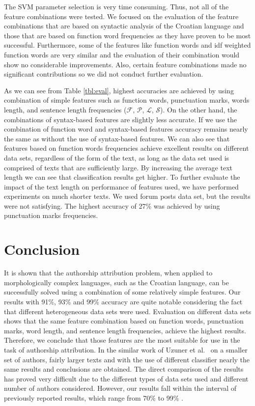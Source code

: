 \documentclass{llncs}
\begin{document}
The SVM parameter selection is very time consuming. Thus, not all of the
feature combinations were tested. We focused on the evaluation of the feature
combinations that are based on syntactic analysis of the Croatian language and
those that are based on function word frequencies as they have proven to be most
successful. Furthermore, some of the features like function words and idf
weighted function words are very similar and the evaluation of their combination
would show no considerable improvements. Also, certain feature combinations made
no significant contributions so we did not conduct further evaluation.

As we can see from Table \ref{tbl:eval}, highest accuracies are achieved by
using combination of simple features such as function words, punctuation marks,
words length, and sentence length frequencies ($\mathcal{F}$, $\mathcal{P}$, $\mathcal{L}$, $\mathcal{S}$). On the other hand, the combinations of syntax-based features are slightly less accurate. If we use the combination of function word and syntax-based features accuracy remains nearly the same as without the use of syntax-based features. We can also see that features based on function words frequencies achieve excellent results on different data sets, regardless
of the form of the text, as long as the data set used is comprised of texts that
are sufficiently large. By increasing the average text length we can see that
classification results get higher. To further evaluate the impact of the text
length on performance of features used, we have performed experiments on much
shorter texts. We used forum posts data set, but the results were not satisfying.
The highest accuracy of 27\% was achieved by using punctuation marks frequencies.

\section{Conclusion}
It is shown that the authorship attribution problem, when applied to
morphologically complex languages, such as the Croatian language, can be
successfully solved using a combination of some relatively simple features. Our
results with 91\%, 93\% and 99\% accuracy are quite notable considering the fact
that different heterogeneous data sets were used. Evaluation on different data
sets shows that the same feature combination based on function words,
punctuation marks, word length, and sentence length frequencies, achieve the
highest results. Therefore, we conclude that those
features are the most suitable for use in the task of authorship
attribution. In the similar work of Uzuner et al.\ \cite{uzuner2005comparative}
on a smaller set of authors, fairly larger texts and with the use of
different classifier nearly the same results and conclusions are obtained. The
direct comparison of the results has proved very difficult due to the different types of data sets
used  and different number of authors considered. However, our results fall
within the interval of previously reported results, which range from 70\% to 99\%
\cite{argamon2005measuring,coyotl2006authorship,keselj2003n,luyckx2005shallow,stamatatos2001computer,uzuner2005comparative}.
\end{document}
